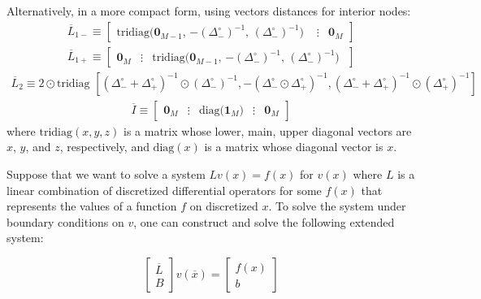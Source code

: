 \documentclass[11pt]{article}
\theoremstyle{definition}
\begin{document}
Alternatively, in a more compact form, using vectors distances for interior nodes:
\begin{align}
\overline{L}_{1-} \equiv 
\begin{bmatrix}
\text{tridiag($\mathbf{0}_{M-1}$, $-(\Delta_-^\circ)^{-1}$, $(\Delta_-^\circ)^{-1}$) } & \vdots & \mathbf{0}_M
\end{bmatrix}
\end{align} 
\begin{align}
\overline{L}_{1+} \equiv 
\begin{bmatrix}
\mathbf{0}_M & \vdots &
\text{tridiag($\mathbf{0}_{M-1}$, $-(\Delta_-^\circ)^{-1}$, $(\Delta_-^\circ)^{-1}$) }  
\end{bmatrix}
\end{align}
\begin{align}
\overline{L}_{2} \equiv 
2 \odot \text{tridiag $\left[(\Delta_-^\circ + \Delta_+^\circ)^{-1} \odot (\Delta_{-}^\circ)^{-1}, -(\Delta_-^\circ \odot \Delta_+^\circ)^{-1} , (\Delta_-^\circ + \Delta_+^\circ)^{-1} \odot (\Delta_{+}^\circ)^{-1} \right]$  }
\end{align}
\begin{align}
\overline{I} \equiv 
\begin{bmatrix}
\mathbf{0}_M & \vdots & \text{diag($\mathbf{1}_M$)} & \vdots & \mathbf{0}_M
\end{bmatrix}
\end{align}
where $\text{tridiag}(x,y,z)$ is a matrix whose lower, main, upper diagonal vectors are $x$, $y$, and $z$, respectively, and $\text{diag}(x)$ is a matrix whose diagonal vector is $x$.

Suppose that we want to solve a system $L v({x}) = f(x) $ for $v(x)$ where $L$ is a linear combination of discretized differential operators for some $f(x)$ that represents the values of a function $f$ on discretized $x$. To solve the system under boundary conditions on $v$, one can construct and solve the following extended system:

\begin{equation}\label{eq:reflecting-barrier-extended-system}
\begin{bmatrix}
\overline{L} \\
B
\end{bmatrix} 
v(\overline{x}) = 
\begin{bmatrix}
f(x) \\
b
\end{bmatrix} 
\end{equation}
\end{document}
